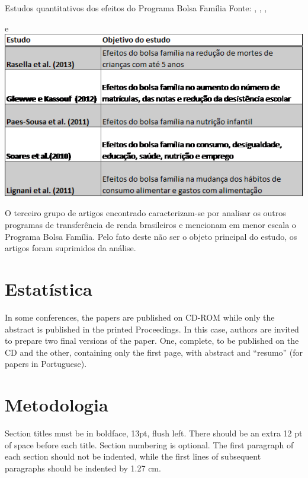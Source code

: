 \documentclass[12pt]{article}
\begin{document}
\begin{table}[ht]
\centering
\caption{Estudos quantitativos dos efeitos do Programa Bolsa Família \newline
Fonte: \cite{Rasella:2013}, \cite{glewwe2012impact}, \cite{Paes-Sousa:2011}, \cite{soares2010evaluating}} e \cite{Lignani:2011}
\label{tab:exTable3}
\includegraphics[width=1\textwidth]{bolsa_familia_semelhantes.png}
\end{table} 

	O terceiro grupo de artigos encontrado caracterizam-se por analisar os outros programas de transferência de renda brasileiros e mencionam em menor escala o Programa Bolsa Família. Pelo fato deste não ser o objeto principal do estudo, os artigos foram suprimidos da análise.



\section{Estatística}

In some conferences, the papers are published on CD-ROM while only the
abstract is published in the printed Proceedings. In this case, authors are
invited to prepare two final versions of the paper. One, complete, to be
published on the CD and the other, containing only the first page, with
abstract and ``resumo'' (for papers in Portuguese).

\section{Metodologia}

Section titles must be in boldface, 13pt, flush left. There should be an extra
12 pt of space before each title. Section numbering is optional. The first
paragraph of each section should not be indented, while the first lines of
subsequent paragraphs should be indented by 1.27 cm.
\end{document}
